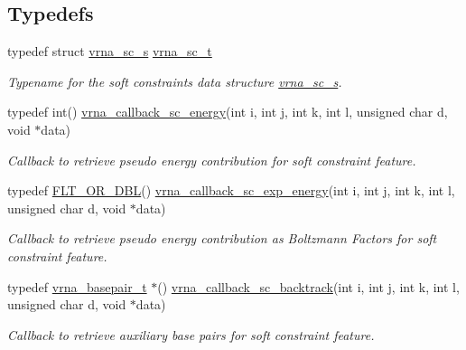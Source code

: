 \subsection*{Typedefs}
\begin{DoxyCompactItemize}
\item 
\mbox{\label{group__soft__constraints_ga75401ce219ef8dbcceb672db82d434c6}} 
typedef struct \hyperlink{group__soft__constraints_structvrna__sc__s}{vrna\+\_\+sc\+\_\+s} \hyperlink{group__soft__constraints_ga75401ce219ef8dbcceb672db82d434c6}{vrna\+\_\+sc\+\_\+t}
\begin{DoxyCompactList}\small\item\em Typename for the soft constraints data structure \hyperlink{group__soft__constraints_structvrna__sc__s}{vrna\+\_\+sc\+\_\+s}. \end{DoxyCompactList}\item 
typedef int() \hyperlink{group__soft__constraints_ga88a266695d9e25cc12114dceb7b4565e}{vrna\+\_\+callback\+\_\+sc\+\_\+energy}(int i, int j, int k, int l, unsigned char d, void $\ast$data)
\begin{DoxyCompactList}\small\item\em Callback to retrieve pseudo energy contribution for soft constraint feature. \end{DoxyCompactList}\item 
typedef \hyperlink{group__data__structures_ga31125aeace516926bf7f251f759b6126}{F\+L\+T\+\_\+\+O\+R\+\_\+\+D\+BL}() \hyperlink{group__soft__constraints_ga4099978d410513edeeff8f3db13144c5}{vrna\+\_\+callback\+\_\+sc\+\_\+exp\+\_\+energy}(int i, int j, int k, int l, unsigned char d, void $\ast$data)
\begin{DoxyCompactList}\small\item\em Callback to retrieve pseudo energy contribution as Boltzmann Factors for soft constraint feature. \end{DoxyCompactList}\item 
typedef \hyperlink{group__data__structures_gac8c5669d3fb813cacf506489689305ce}{vrna\+\_\+basepair\+\_\+t} $\ast$() \hyperlink{group__soft__constraints_gaeb6448da6c593d4c489c7fbadcb99499}{vrna\+\_\+callback\+\_\+sc\+\_\+backtrack}(int i, int j, int k, int l, unsigned char d, void $\ast$data)
\begin{DoxyCompactList}\small\item\em Callback to retrieve auxiliary base pairs for soft constraint feature. \end{DoxyCompactList}\end{DoxyCompactItemize}

